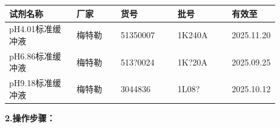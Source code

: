 \documentclass[UTF8,10pt,a4paper,fontset=fandol]{ctexart}
\newcommand{\fieldvalue}[1]{#1}
\newcommand{\handwritten}[1]{#1}
\begin{document}
\begin{tabular}{|p{0.27\linewidth}|p{0.18\linewidth}|p{0.22\linewidth}|p{0.21\linewidth}|l|}
\hline
试剂名称 & 厂家 & 货号 & 批号 & 有效至 \\
\hline
\fieldvalue{pH4.01标准缓冲液} &
\fieldvalue{梅特勒} &
\fieldvalue{51350007} &
\fieldvalue{\handwritten{1K240A}} &
\fieldvalue{\handwritten{2025.11.20}}
\\ \hline
\fieldvalue{pH6.86标准缓冲液} &
\fieldvalue{梅特勒} &
\fieldvalue{513?0024} &
\fieldvalue{\handwritten{1K?20A}} &
\fieldvalue{\handwritten{2025.09.25}}
\\ \hline
\fieldvalue{pH9.18标准缓冲液} &
\fieldvalue{梅特勒} &
\fieldvalue{3044836} &
\fieldvalue{\handwritten{1L08?}} &
\fieldvalue{\handwritten{2025.10.12}}
\\ \hline
\end{tabular}

\bigskip

\textbf{2.\quad 操作步骤：}
\end{document}
